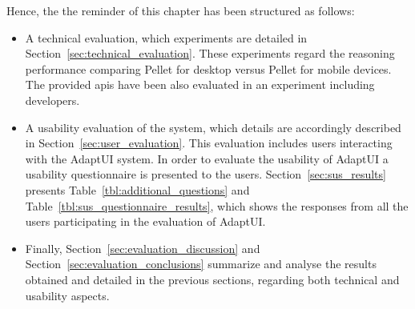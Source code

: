 Hence, the the reminder of this chapter has been structured as follows: 

\begin{itemize}
  \item A technical evaluation, which experiments are detailed in 
  Section~\ref{sec:technical_evaluation}. These experiments regard the 
  reasoning performance comparing Pellet for desktop versus Pellet for mobile 
  devices. The provided \acp{api} have been also evaluated in an experiment
  including developers.
  
  \item A usability evaluation of the system, which details are accordingly 
  described in Section~\ref{sec:user_evaluation}. This evaluation includes 
  users interacting with the AdaptUI system. In order to evaluate the usability 
  of AdaptUI a usability questionnaire is presented to the users. 
  Section~\ref{sec:sus_results} presents Table~\ref{tbl:additional_questions} and
  Table~\ref{tbl:sus_questionnaire_results}, which shows the responses from all
  the users participating in the evaluation of AdaptUI.

  \item Finally, Section~\ref{sec:evaluation_discussion} and 
  Section~\ref{sec:evaluation_conclusions} summarize and analyse the results
  obtained and detailed in the previous sections, regarding both technical and
  usability aspects.
\end{itemize}





%

% 

